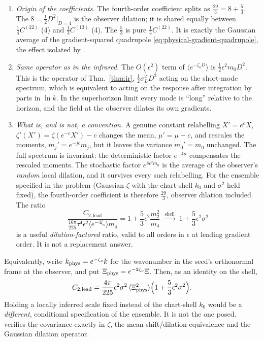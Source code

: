 \documentclass[11pt]{article}
\theoremstyle{definition}
\theoremstyle{remark}
\newcommand{\eps}{\epsilon}
\newcommand{\ens}[1]{\langle #1\rangle}
\begin{document}
\begin{enumerate}
\item \emph{Origin of the coefficients.} The fourth-order coefficient splits as
  $\frac{29}{3}=8+\frac53$. The $8=\frac12D^2|_{D=4}$ is the observer dilation; it is shared
  equally between $\frac14C^{(22)}$ (4) and $\frac13C^{(13)}$ (4). The $\frac53$ is pure
  $\frac14C^{(22)}$. It is exactly the Gaussian average of the gradient-squared quadrupole
  \eqref{eq:physical-gradient-quadrupole}, the effect isolated by \cite{MirbabayiZaldarriaga}.
\item \emph{Same operator as in the infrared.} The $O(\eps^2)$ term of
  $\ens{e^{-\zeta_oD}}$ is $\frac12\eps^2m_0D^2$. This is the operator of Thm.~\ref{thm:ir},
  $\frac12\sigma_L^2D^2$ acting on the short-mode spectrum, which is equivalent to acting on
  the response after integration by parts in $\ln k$. In the superhorizon limit every mode is
  ``long'' relative to the horizon, and the field at the observer dilates its own gradients.
\item \emph{What is, and is not, a convention.} A genuine constant relabelling
  $X'=e^cX$, $\zeta'(X')=\zeta(e^{-c}X')-c$ changes the mean, $\mu'=\mu-c$, and rescales the
  moments, $m_j'=e^{-jc}m_j$, but it leaves the variance $m_0'=m_0$ unchanged. The full
  spectrum is invariant: the deterministic factor $e^{-4\mu}$ compensates the rescaled
  moments. The stochastic factor $e^{8\eps^2m_0}$ is the average of the observer's
  \emph{random} local dilation, and it survives every such relabelling. For the ensemble
  specified in the problem (Gaussian $\zeta$ with the chart-shell $k_0$ and $\sigma^2$ held
  fixed), the fourth-order coefficient is therefore $\frac{29}{3}$, observer dilation
  included. The ratio
  \begin{equation}\label{eq:sh-invariant-ratio}
  \frac{C_{2,\mathrm{lead}}}{\frac{16\pi}{225}\tau^4\eps^2\ens{e^{-4\zeta_o}}m_4}
  =1+\frac53\eps^2\frac{m_2^2}{m_4}
  \ \xrightarrow{\ \text{shell}\ }\ 1+\frac53\eps^2\sigma^2
  \end{equation}
  is a useful \emph{dilation-factored} ratio, valid to all orders in $\eps$ at leading
  gradient order. It is not a replacement answer.
\end{enumerate}
Equivalently, write $k_{\rm phys}=e^{-\zeta_o}k$ for the wavenumber in the seed's
orthonormal frame at the observer, and put $\Xi_{\rm phys}=e^{-2\zeta_o}\Xi$. Then, as an
identity on the shell,
\begin{equation}\label{eq:sh-physical}
C_{2,\mathrm{lead}}=\frac{4\pi}{225}\eps^2\sigma^2\,\ens{\Xi_{\rm phys}^2}
\Big(1+\frac53\eps^2\sigma^2\Big).
\end{equation}
Holding a locally inferred scale fixed instead of the chart-shell $k_0$ would be a
\emph{different}, conditional specification of the ensemble. It is not the one posed.
 verifies the covariance exactly in $\zeta$,
the mean-shift/dilation equivalence and the Gaussian dilation operator.
\end{document}
